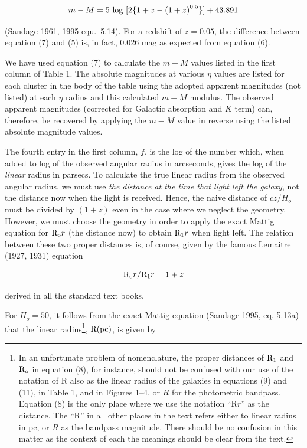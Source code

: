 \documentclass[preprint]{aastex}
\begin{document}
\begin{equation}
      m - M = 5~{\rm log}~[2\{1 + z - {(1 + z)}^{0.5}\}] + 43.891
\end{equation}

\noindent (Sandage 1961, 1995 equ.\ 5.14). For a redshift of $z =
0.05$, the difference between equation (7) and (5) is, in fact, 0.026
mag as expected from equation (6).
     
We have used equation (7) to calculate the $m - M$ values listed in
the first column of Table 1. The absolute magnitudes at various $\eta$
values are listed for each cluster in the body of the table using the
adopted apparent magnitudes (not listed) at each $\eta$ radius and
this calculated $m - M$ modulus. The observed apparent magnitudes
(corrected for Galactic absorption and $K$ term) can, therefore, be
recovered by applying the $m - M$ value in reverse using the listed
absolute magnitude values.
     
The fourth entry in the first column, $f$, is the log of the number
which, when added to log of the observed angular radius in arcseconds,
gives the log of the {\it linear} radius in parsecs. To calculate the
true linear radius from the observed angular radius, we must use {\it
the distance at the time that light left the galaxy}, not the distance
now when the light is received. Hence, the naive distance of $cz/H_o$
must be divided by $(1 + z)$ even in the case where we neglect the
geometry. However, we must choose the geometry in order to apply the
exact Mattig equation for ${\rm R_o} r$ (the distance now) to obtain
${\rm R_1} r$ when light left. The relation between these two proper
distances is, of course, given by the famous Lemaitre (1927, 1931)
equation

\begin{equation}
                 {\rm R_o} r/{\rm R_1} r = 1 + z
\end{equation}

\noindent derived in all the standard text books.
     
For $H_o = 50$, it follows from the exact Mattig equation (Sandage
1995, eq. 5.13a) that the linear radius\footnote{In an unfortunate
problem of nomenclature, the proper distances of ${\rm R_1}$ and ${\rm
R_o}$ in equation (8), for instance, should not be confused with our
use of the notation of R also as the linear radius of the galaxies in
equations (9) and (11), in Table 1, and in Figures 1--4, or $R$ for
the photometric bandpass. Equation (8) is the only place where we use
the notation ``R$r$'' as the distance. The ``R'' in all other places
in the text refers either to linear radius in pc, or $R$ as the
bandpass magnitude. There should be no confusion in this matter as the
context of each the meanings should be clear from the text.}, ${\rm
R(pc)}$, is given by
\end{document}
